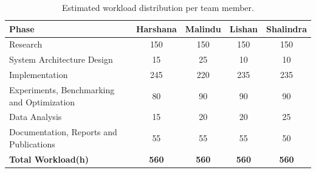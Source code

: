 \begin{table}[htbp]
\centering
\begin{tabular}{lcccc}
\toprule
\textbf{Phase} & \textbf{Harshana} & \textbf{Malindu} & \textbf{Lishan} & \textbf{Shalindra} \\
\midrule
Research & 150 & 150 & 150 & 150 \\
System Architecture Design & 15 & 25 & 10 & 10 \\
Implementation & 245 & 220 & 235 & 235 \\
Experiments, Benchmarking and Optimization & 80 & 90 & 90 & 90 \\
Data Analysis & 15 & 20 & 20 & 25 \\
Documentation, Reports and Publications & 55 & 55 & 55 & 50 \\
\midrule
\textbf{Total Workload(h)} & \textbf{560} & \textbf{560} & \textbf{560} & \textbf{560}\\
\bottomrule
\end{tabular}
\caption{Estimated workload distribution per team member.}
\label{tab:workload}
\end{table}